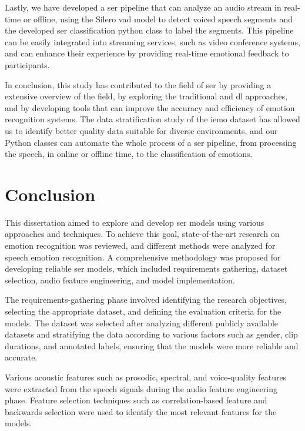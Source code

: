 Lastly, we have developed a \ac{ser} pipeline that can analyze an audio stream in real-time or offline, using the Silero \ac{vad} model to detect voiced speech segments and the developed \ac{ser} classification python class to label the segments. This pipeline can be easily integrated into streaming services, such as video conference systems, and can enhance their experience by providing real-time emotional feedback to participants.

In conclusion, this study has contributed to the field of \ac{ser} by providing a extensive overview of the field, by exploring the traditional and \ac{dl} approaches, and by developing tools that can improve the accuracy and efficiency of emotion recognition systems. The data stratification study of the \ac{iemo} dataset has allowed us to identify better quality data suitable for diverse environments, and our Python classes can automate the whole process of a \ac{ser} pipeline, from processing the speech, in online or offline time, to the classification of emotions.

\section{Conclusion}

This dissertation aimed to explore and develop \ac{ser} models using various approaches and techniques. To achieve this goal, state-of-the-art research on emotion recognition was reviewed, and different methods were analyzed for speech emotion recognition. A comprehensive methodology was proposed for developing reliable \ac{ser} models, which included requirements gathering, dataset selection, audio feature engineering, and model implementation.

The requirements-gathering phase involved identifying the research objectives, selecting the appropriate dataset, and defining the evaluation criteria for the models. The dataset was selected after analyzing different publicly available datasets and stratifying the data according to various factors such as gender, clip durations, and annotated labels, ensuring that the models were more reliable and accurate.

Various acoustic features such as prosodic, spectral, and voice-quality features were extracted from the speech signals during the audio feature engineering phase. Feature selection techniques such as correlation-based feature and backwards selection were used to identify the most relevant features for the models.

